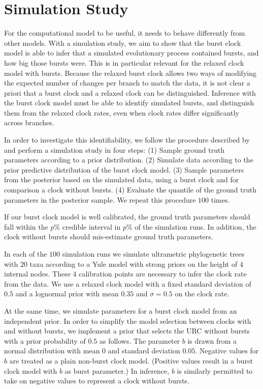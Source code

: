 \documentclass[]{rsos}%
\begin{document}
\section{Simulation Study}
\label{s:simulation}
For the computational model to be useful, it needs to behave differently from
other models. With a simulation study, we aim to show that the burst clock model is able to
infer that a simulated evolutionary process contained bursts, and how big those bursts were.
This is in particular relevant for the relaxed clock model with bursts.
Because the relaxed burst clock allows two ways of modifying the expected number
of changes per branch to match the data, it is not clear a priori that a burst
clock and a relaxed clock can be distinguished.
Inference with the burst clock model must be able to identify simulated bursts, and distinguish them from the relaxed clock rates, even when clock rates differ significantly across branches.

In order to investigate this identifiability,
we follow the procedure described by \textcite{cook2006validation} and perform a simulation study in four steps: (1) Sample ground truth parameters according to a prior distribution. (2) Simulate data according to the prior predictive distribution of the burst clock model. (3) Sample parameters from the posterior based on the simulated data, using a burst clock and for comparison a clock without bursts. (4) Evaluate the quantile of the ground truth parameters in the posterior sample.
We repeat this procedure $100$ times.

If our burst clock model is well calibrated, the ground truth parameters should fall within the $p\%$ credible interval in $p\%$ of the simulation runs. In addition, the clock without bursts should mis-estimate ground truth parameters.

In each of the $100$ simulation runs we simulate ultrametric phylogenetic trees with $20$ taxa according to a Yule model with strong priors on the height of $4$ internal nodes. These $4$ calibration points are necessary to infer the clock rate from the data. We use a relaxed clock model with a fixed standard deviation of $0.5$ and a lognormal prior with mean $0.35$ and $\sigma = 0.5$ on the clock rate.

At the same time, we simulate parameters for a burst clock model from an independent prior. In order to simplify the model selection between clocks with and without bursts, we implement a prior that selects the URC without bursts with a prior probability of $0.5$ as follows. The parameter $b$ is drawn from a normal distribution with mean $0$ and standard deviation $0.05$. Negative values for $b$ are treated as a plain non-burst clock model. (Positive values result in a burst clock model with $b$ as burst parameter.) In inference, $b$ is similarly permitted to take on negative values to represent a clock without bursts.
\end{document}

